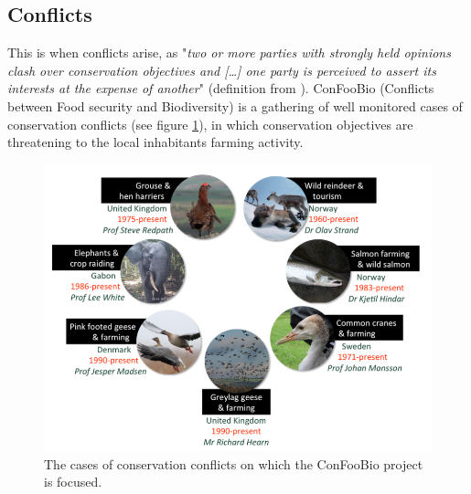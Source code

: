 \documentclass[12pt,a4paper]{article}
\begin{document}
\subsection{Conflicts}

This is when conflicts arise, as "\textit{two or more parties with strongly held opinions clash over conservation objectives and [\dots] one party is perceived to assert its interests at the expense of another}" (definition from \cite{redpath2013understanding}).
ConFooBio (Conflicts between Food security and Biodiversity) is a gathering of well monitored cases of conservation conflicts (see figure \ref{confoobio}), in which conservation objectives are threatening to the local inhabitants farming activity.
\begin{figure}
	\centering
	\includegraphics[scale=0.5]{confoobio-cases.png}
	\caption{The cases of conservation conflicts on which the ConFooBio project is focused.}
	\label{confoobio}
\end{figure}
\end{document}
